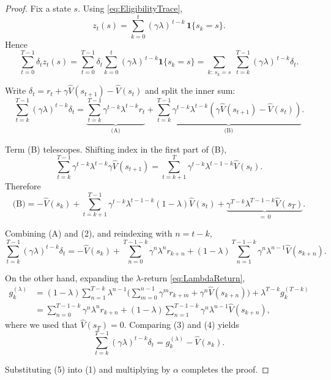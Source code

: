 \documentclass[
]{book}
\theoremstyle{definition}
\theoremstyle{definition}
\theoremstyle{definition}
\theoremstyle{definition}
\theoremstyle{remark}
\begin{document}
\begin{proof}
Fix a state \(s\). Using \eqref{eq:EligibilityTrace},
\[
z_t(s)=\sum_{k=0}^{t}(\gamma\lambda)^{\,t-k}\,\mathbf{1}\{s_k=s\}.
\]
Hence
\[
\sum_{t=0}^{T-1}\delta_t z_t(s)
=\sum_{t=0}^{T-1}\delta_t \sum_{k=0}^{t}(\gamma\lambda)^{\,t-k}\mathbf{1}\{s_k=s\}
=\sum_{k:\,s_k=s}\; \sum_{t=k}^{T-1} (\gamma\lambda)^{\,t-k}\delta_t .
\tag{1}
\]

Write \(\delta_t=r_t+\gamma\hat V(s_{t+1})-\hat V(s_t)\) and split the inner sum:
\[
\sum_{t=k}^{T-1} (\gamma\lambda)^{t-k}\delta_t
= \underbrace{\sum_{t=k}^{T-1} \gamma^{t-k}\lambda^{t-k} r_t}_{\text{(A)}}
+ \underbrace{\sum_{t=k}^{T-1}\gamma^{t-k}\lambda^{t-k}(\gamma\hat V(s_{t+1})-\hat V(s_t))}_{\text{(B)}}.
\]

Term (B) telescopes. Shifting index in the first part of (B),
\[
\sum_{t=k}^{T-1}\gamma^{t-k}\lambda^{t-k}\gamma \hat V(s_{t+1})
= \sum_{t=k+1}^{T}\gamma^{t-k}\lambda^{t-1-k}\hat V(s_t).
\]
Therefore
\[
\text{(B)}=
-\hat V(s_k) 
+ \sum_{t=k+1}^{T-1}\gamma^{t-k}\lambda^{t-1-k}(1-\lambda)\hat V(s_t)
+ \underbrace{\gamma^{T-k}\lambda^{T-1-k}\hat V(s_T)}_{=\,0}.
\tag{2}
\]

Combining (A) and (2), and reindexing with \(n=t-k\),
\[
\sum_{t=k}^{T-1} (\gamma\lambda)^{t-k}\delta_t
= -\hat V(s_k)
+ \sum_{n=0}^{T-1-k}\gamma^{n}\lambda^{n} r_{k+n}
+ (1-\lambda)\sum_{n=1}^{T-1-k}\gamma^{n}\lambda^{n-1}\hat V(s_{k+n}).
\tag{3}
\]

On the other hand, expanding the \(\lambda\)-return \eqref{eq:LambdaReturn},
\[
\begin{aligned}
g_k^{(\lambda)}
&=(1-\lambda)\sum_{n=1}^{T-k}\lambda^{n-1}
\Bigg(\sum_{m=0}^{n-1}\gamma^{m} r_{k+m} + \gamma^{n}\hat V(s_{k+n})\Bigg) + \lambda^{T-k} g_k^{(T-k)}\\
&= \sum_{n=0}^{T-1-k}\gamma^{n}\lambda^{n} r_{k+n}
+ (1-\lambda)\sum_{n=1}^{T-1-k}\gamma^{n}\lambda^{n-1}\hat V(s_{k+n}),
\end{aligned}
\tag{4}
\]
where we used that \(\hat V(s_T)=0\). Comparing (3) and (4) yields
\[
\sum_{t=k}^{T-1} (\gamma\lambda)^{t-k}\delta_t
= g_k^{(\lambda)} - \hat V(s_k).
\tag{5}
\]

Substituting (5) into (1) and multiplying by \(\alpha\) completes the proof.
\end{proof}
\end{document}
